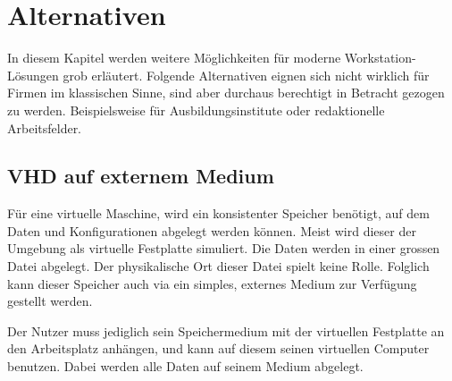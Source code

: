 



\section{Alternativen}
In diesem Kapitel werden weitere Möglichkeiten für moderne Workstation-Lösungen grob erläutert.
Folgende Alternativen eignen sich nicht wirklich für Firmen im klassischen Sinne, sind aber durchaus berechtigt in Betracht gezogen zu werden. Beispielsweise für Ausbildungsinstitute oder redaktionelle Arbeitsfelder.

\subsection{VHD auf externem Medium}
Für eine virtuelle Maschine, wird ein konsistenter Speicher benötigt, auf dem Daten und Konfigurationen abgelegt werden können.
Meist wird dieser der Umgebung als virtuelle Festplatte simuliert. Die Daten werden in einer grossen Datei abgelegt. Der physikalische Ort dieser Datei spielt keine Rolle.
Folglich kann dieser Speicher auch via ein simples, externes Medium zur Verfügung gestellt werden.

Der Nutzer muss jediglich sein Speichermedium mit der virtuellen Festplatte an den Arbeitsplatz anhängen, und kann auf diesem seinen virtuellen Computer benutzen.
Dabei werden alle Daten auf seinem Medium abgelegt.

